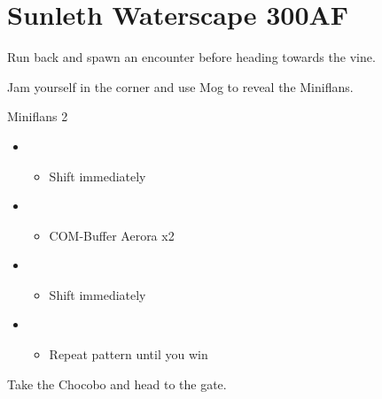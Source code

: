 \chapter{Sunleth Waterscape 300AF}

Run back and spawn an encounter before heading towards the vine.


Jam yourself in the corner and use Mog to reveal the Miniflans.

\begin{battle}{Miniflans 2}
	\begin{itemize}
		\item \sixth
		      \begin{itemize}
			      \item Shift immediately
		      \end{itemize}
		\item \second
		      \begin{itemize}
			      \item COM-Buffer Aerora x2
		      \end{itemize}
		\item \first
		      \begin{itemize}
			      \item Shift immediately
		      \end{itemize}
		\item \sixth
		      \begin{itemize}
			      \item Repeat pattern until you win
		      \end{itemize}
	\end{itemize}
\end{battle}

Take the Chocobo and head to the gate.
\newline